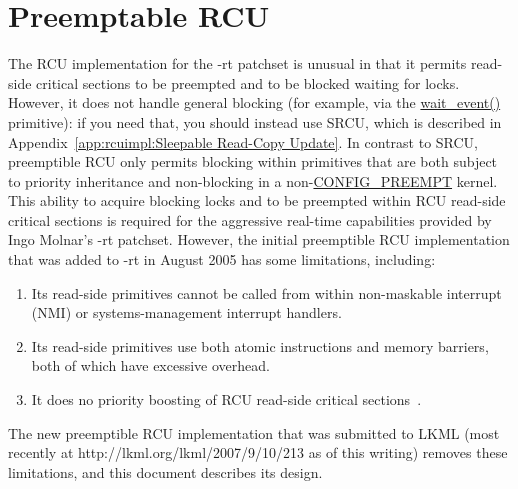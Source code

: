 
\section{Preemptable RCU}
\label{app:rcuimpl:Preemptable RCU}

The RCU implementation for the -rt patchset is unusual in that
it permits read-side critical
sections to be preempted and to be blocked waiting for locks.
However, it does not handle general blocking
(for example, via the \url{wait_event()} primitive):
if you need that, you should instead use SRCU, which is described in
Appendix~\ref{app:rcuimpl:Sleepable Read-Copy Update}.
In contrast to SRCU,
preemptible RCU only permits blocking within primitives that are
both subject to priority inheritance and non-blocking in a
non-\url{CONFIG_PREEMPT} kernel.
This ability to acquire blocking locks and to be preempted within
RCU read-side critical sections is required for the aggressive real-time
capabilities provided by Ingo Molnar's -rt patchset.
However, the initial preemptible RCU implementation
that was added to -rt in August 2005 has some limitations, including:

\begin{enumerate}
\item	Its read-side primitives cannot be called from within
	non-maskable interrupt (NMI) or systems-management interrupt
	handlers.
\item	Its read-side primitives use both atomic instructions and
	memory barriers, both of which have excessive overhead.
\item	It does no priority boosting of RCU read-side critical
	sections~\cite{PaulEMcKenney2007BoostRCU}.
\end{enumerate}

The new preemptible RCU implementation that was submitted to LKML (most
recently at http://lkml.org/lkml/2007/9/10/213 as of this writing)
removes these limitations, and this document describes its design.

 \QuickQuizEnd

